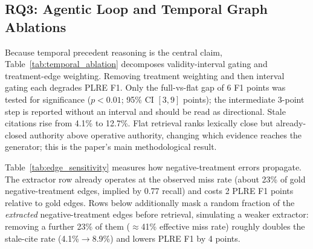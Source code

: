 \subsection{RQ3: Agentic Loop and Temporal Graph Ablations}

Because temporal precedent reasoning is the central claim, Table~\ref{tab:temporal_ablation} decomposes validity-interval gating and treatment-edge weighting. Removing treatment weighting and then interval gating each degrades PLRE F1. Only the full-vs-flat gap of 6 F1 points was tested for significance ($p<0.01$; 95\% CI $[3,9]$ points); the intermediate 3-point step is reported without an interval and should be read as directional. Stale citations rise from 4.1\% to 12.7\%. Flat retrieval ranks lexically close but already-closed authority above operative authority, changing which evidence reaches the generator; this is the paper's main methodological result.

\begin{table}[t]
\centering
\caption{Temporal precedent-graph ablation (main claim). Both mechanisms of Eq.~\eqref{eq:tpg_score} are removed in sequence; the bottom row recovers flat semantic similarity. Stale-cite measures citations to already-closed precedent ($t_q\!\ge\!e_v$). Only the full-vs-flat difference was significance-tested ($p<0.01$; 95\% CI of $\Delta$F1 $[3,9]$ points).}
\label{tab:temporal_ablation}
\small
\setlength{\tabcolsep}{4pt}
\end{table}

Table~\ref{tab:edge_sensitivity} measures how negative-treatment errors propagate. The extractor row already operates at the observed miss rate (about 23\% of gold negative-treatment edges, implied by 0.77 recall) and costs 2 PLRE F1 points relative to gold edges. Rows below additionally mask a random fraction of the \emph{extracted} negative-treatment edges before retrieval, simulating a weaker extractor: removing a further 23\% of them ($\approx$41\% effective miss rate) roughly doubles the stale-cite rate (4.1\%$\rightarrow$8.9\%) and lowers PLRE F1 by 4 points.

